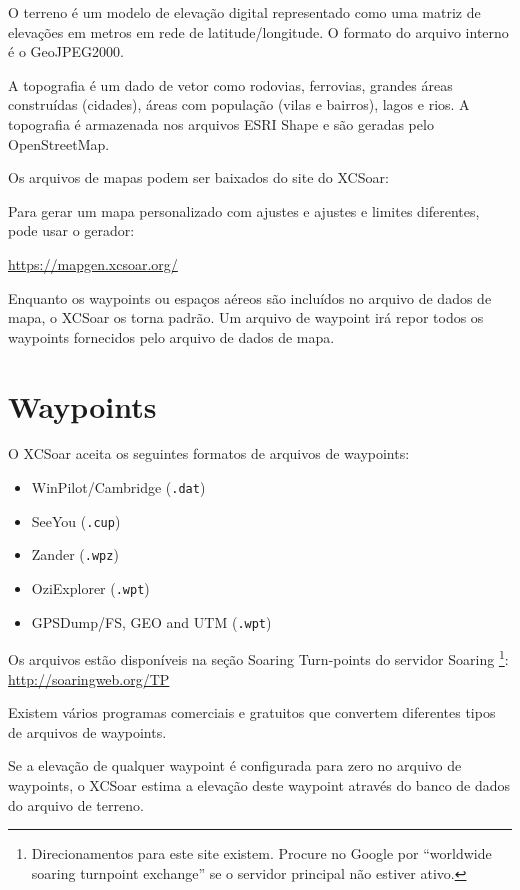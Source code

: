 O terreno é um modelo de elevação digital representado como uma matriz de elevações em metros em rede de latitude/longitude.  O formato do arquivo interno é o GeoJPEG2000.

A topografia é um dado de vetor como rodovias, ferrovias, grandes áreas construídas (cidades), áreas com população (vilas e bairros), lagos e rios.  A topografia é armazenada nos arquivos ESRI Shape e são geradas pelo OpenStreetMap.

Os arquivos de mapas podem ser baixados do site do XCSoar:



Para gerar um mapa personalizado com ajustes e ajustes e limites diferentes, pode usar o gerador:

\url{https://mapgen.xcsoar.org/}

Enquanto os waypoints ou espaços aéreos são incluídos no arquivo de dados de mapa, o XCSoar os torna padrão.  Um arquivo de waypoint irá repor todos os waypoints fornecidos pelo arquivo de dados de mapa.

\section{Waypoints}

O XCSoar aceita os seguintes formatos de arquivos de waypoints:

\begin{itemize}
\item WinPilot/Cambridge (\verb|.dat|)
\item SeeYou (\verb|.cup|)
\item Zander (\verb|.wpz|)
\item OziExplorer (\verb|.wpt|)
\item GPSDump/FS, GEO and UTM (\verb|.wpt|)
\end{itemize}

Os arquivos estão disponíveis na seção Soaring Turn-points do servidor Soaring \footnote{Direcionamentos para este site existem.  Procure no Google por “worldwide soaring turnpoint exchange” se o servidor principal não estiver ativo.}: \url{http://soaringweb.org/TP}

Existem vários programas comerciais e gratuitos que convertem diferentes tipos de arquivos de waypoints.

Se a elevação de qualquer waypoint é configurada para zero no arquivo de waypoints, o XCSoar estima a elevação deste waypoint através do banco de dados do arquivo de terreno.

